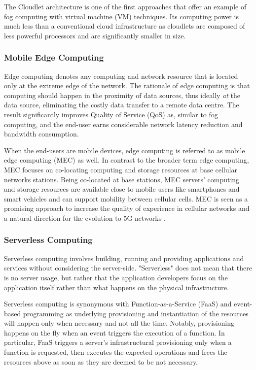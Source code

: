 The Cloudlet \cite{satyanarayanan2009case} architecture is one of the first approaches that offer an example of fog computing with virtual machine (VM) techniques. Its computing power is much less than a conventional cloud infrastructure as cloudlets are composed of less powerful processors and are significantly smaller in size.

\subsubsection{Mobile Edge Computing}

Edge computing \cite{shi2016edge} denotes any computing and network resource that is located only at the extreme edge of the network. The rationale of edge computing is that computing should happen in the proximity of data sources, thus ideally \emph{at} the data source, eliminating the costly data transfer to a remote data centre. The result significantly improves Quality of Service (QoS) as, similar to fog computing, and the end-user earns considerable network latency reduction and bandwidth consumption.

When the end-users are mobile devices, edge computing is referred to as mobile edge computing (MEC) \cite{beck2014mobile} as well. In contrast to the broader term edge computing, MEC focuses on co-locating computing and storage resources at base cellular networks stations. Being co-located at base stations, MEC servers' computing and storage resources are available close to mobile users like smartphones and smart vehicles and can support mobility between cellular cells. MEC is seen as a promising approach to increase the quality of experience in cellular networks and a natural direction for the evolution to 5G networks \cite{yousaf2017nfv}.

\subsubsection{Serverless Computing}

Serverless computing \cite{jonas2019cloud} involves building, running and providing applications and services without considering the server-side. "Serverless" does not mean that there is no server usage, but rather that the application developers focus on the application itself rather than what happens on the physical infrastructure.

Serverless computing is synonymous with Function-as-a-Service (FaaS) and event-based programming as underlying provisioning and instantiation of the resources will happen only when necessary and not all the time. Notably, provisioning happens on the fly when an event triggers the execution of a function. In particular, FaaS triggers a server's infrastructural provisioning only when a function is requested, then executes the expected operations and frees the resources above as soon as they are deemed to be not necessary.

